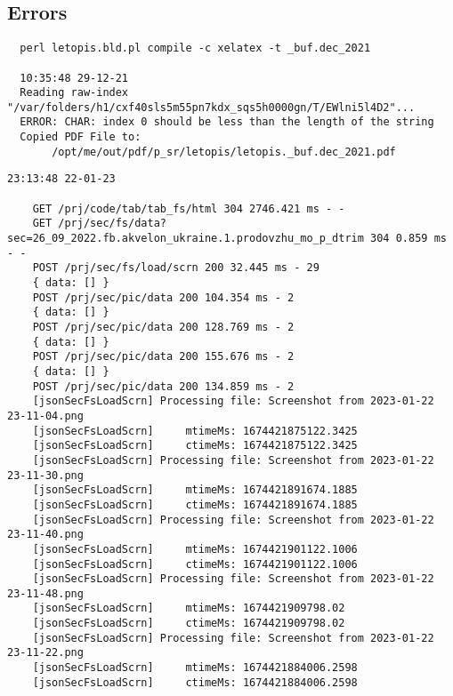  
 
 
 
 

\subsection{Errors}
\label{sec:build.err}

\begin{Verbatim}
  perl letopis.bld.pl compile -c xelatex -t _buf.dec_2021
  
  10:35:48 29-12-21
  Reading raw-index "/var/folders/h1/cxf40sls5m55pn7kdx_sqs5h0000gn/T/EWlni5l4D2"...
  ERROR: CHAR: index 0 should be less than the length of the string
  Copied PDF File to:
       /opt/me/out/pdf/p_sr/letopis/letopis._buf.dec_2021.pdf
\end{Verbatim}

\begin{Verbatim}
23:13:48 22-01-23

	GET /prj/code/tab/tab_fs/html 304 2746.421 ms - -
	GET /prj/sec/fs/data?sec=26_09_2022.fb.akvelon_ukraine.1.prodovzhu_mo_p_dtrim 304 0.859 ms - -
	POST /prj/sec/fs/load/scrn 200 32.445 ms - 29
	{ data: [] }
	POST /prj/sec/pic/data 200 104.354 ms - 2
	{ data: [] }
	POST /prj/sec/pic/data 200 128.769 ms - 2
	{ data: [] }
	POST /prj/sec/pic/data 200 155.676 ms - 2
	{ data: [] }
	POST /prj/sec/pic/data 200 134.859 ms - 2
	[jsonSecFsLoadScrn] Processing file: Screenshot from 2023-01-22 23-11-04.png
	[jsonSecFsLoadScrn]     mtimeMs: 1674421875122.3425
	[jsonSecFsLoadScrn]     ctimeMs: 1674421875122.3425
	[jsonSecFsLoadScrn] Processing file: Screenshot from 2023-01-22 23-11-30.png
	[jsonSecFsLoadScrn]     mtimeMs: 1674421891674.1885
	[jsonSecFsLoadScrn]     ctimeMs: 1674421891674.1885
	[jsonSecFsLoadScrn] Processing file: Screenshot from 2023-01-22 23-11-40.png
	[jsonSecFsLoadScrn]     mtimeMs: 1674421901122.1006
	[jsonSecFsLoadScrn]     ctimeMs: 1674421901122.1006
	[jsonSecFsLoadScrn] Processing file: Screenshot from 2023-01-22 23-11-48.png
	[jsonSecFsLoadScrn]     mtimeMs: 1674421909798.02
	[jsonSecFsLoadScrn]     ctimeMs: 1674421909798.02
	[jsonSecFsLoadScrn] Processing file: Screenshot from 2023-01-22 23-11-22.png
	[jsonSecFsLoadScrn]     mtimeMs: 1674421884006.2598
	[jsonSecFsLoadScrn]     ctimeMs: 1674421884006.2598
\end{Verbatim}



